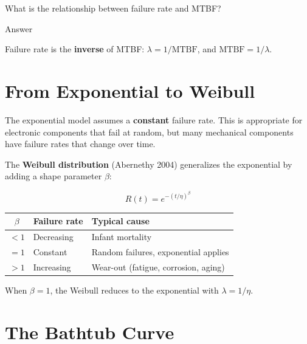 \documentclass[
  letterpaper,
  DIV=11,
  numbers=noendperiod]{scrreprt}
\newcounter{none} %
\begin{document}
\begin{tcolorbox}[enhanced jigsaw, arc=.35mm, bottomrule=.15mm, bottomtitle=1mm, breakable, colback=white, colbacktitle=quarto-callout-tip-color!10!white, colframe=quarto-callout-tip-color-frame, coltitle=black, left=2mm, leftrule=.75mm, opacityback=0, opacitybacktitle=0.6, rightrule=.15mm, title=\textcolor{quarto-callout-tip-color}{\faLightbulb}\hspace{0.5em}{Review}, titlerule=0mm, toprule=.15mm, toptitle=1mm]

What is the relationship between failure rate and MTBF?

Answer

Failure rate is the \textbf{inverse} of MTBF:
\(\lambda = 1/\text{MTBF}\), and \(\text{MTBF} = 1/\lambda\).

\end{tcolorbox}

\section{From Exponential to Weibull}\label{from-exponential-to-weibull}

The exponential model assumes a \textbf{constant} failure rate. This is
appropriate for electronic components that fail at random, but many
mechanical components have failure rates that change over time.

The \textbf{Weibull distribution} (Abernethy 2004) generalizes the
exponential by adding a shape parameter \(\beta\):

\[R(t) = e^{-(t/\eta)^\beta}\]

{\def\LTcaptype{none} %
\begin{longtable}[]{@{}cll@{}}
\toprule\noalign{}
\(\beta\) & Failure rate & Typical cause \\
\midrule\noalign{}
\endhead
\bottomrule\noalign{}
\endlastfoot
\(< 1\) & Decreasing & Infant mortality \\
\(= 1\) & Constant & Random failures, exponential applies \\
\(> 1\) & Increasing & Wear-out (fatigue, corrosion, aging) \\
\end{longtable}
}

When \(\beta = 1\), the Weibull reduces to the exponential with
\(\lambda = 1/\eta\).

\section{The Bathtub Curve}\label{the-bathtub-curve}
\end{document}
